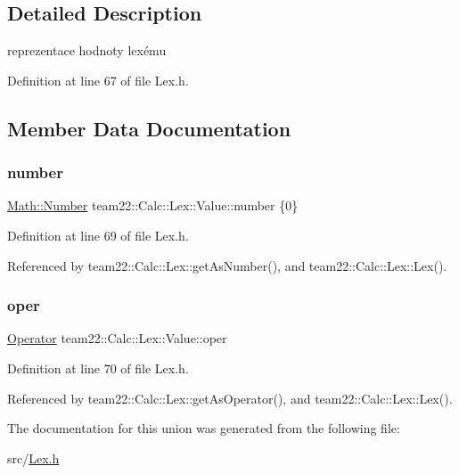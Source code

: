 \subsection{Detailed Description}
reprezentace hodnoty lexému 

Definition at line 67 of file Lex.\+h.



\subsection{Member Data Documentation}
\mbox{\label{unionteam22_1_1_calc_1_1_lex_1_1_value_a86e2e3ea0c887ca50885bcdb8f1ec5ce}} 
\subsubsection{\texorpdfstring{number}{number}}
{\footnotesize\ttfamily \hyperlink{classteam22_1_1_math_1_1_number}{Math\+::\+Number} team22\+::\+Calc\+::\+Lex\+::\+Value\+::number \{0\}}



Definition at line 69 of file Lex.\+h.



Referenced by team22\+::\+Calc\+::\+Lex\+::get\+As\+Number(), and team22\+::\+Calc\+::\+Lex\+::\+Lex().

\mbox{\label{unionteam22_1_1_calc_1_1_lex_1_1_value_ade46fa860d495ce4d431d3934210579d}} 
\subsubsection{\texorpdfstring{oper}{oper}}
{\footnotesize\ttfamily \hyperlink{classteam22_1_1_calc_1_1_lex_a61d29fc4878a3b36d2de2f13c56ed932}{Operator} team22\+::\+Calc\+::\+Lex\+::\+Value\+::oper}



Definition at line 70 of file Lex.\+h.



Referenced by team22\+::\+Calc\+::\+Lex\+::get\+As\+Operator(), and team22\+::\+Calc\+::\+Lex\+::\+Lex().



The documentation for this union was generated from the following file\+:\begin{DoxyCompactItemize}
\item 
src/\hyperlink{_lex_8h}{Lex.\+h}\end{DoxyCompactItemize}

